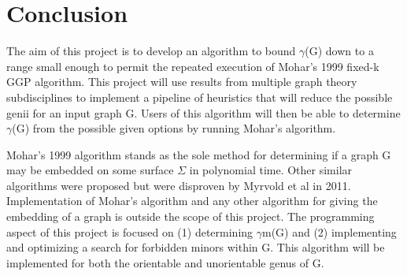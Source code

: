 \documentclass[12pt,conference]{IEEEtran}
\begin{document}
\section{Conclusion}

The aim of this project is to develop an algorithm to bound $\gamma$(G) down to a range small enough to permit the repeated execution of Mohar's 1999 fixed-k GGP algorithm. This project will use results from multiple graph theory subdisciplines to implement a pipeline of heuristics that will reduce the possible genii for an input graph G. Users of this algorithm will then be able to determine $\gamma$(G) from the possible given options by running Mohar's algorithm.

Mohar's 1999 algorithm stands as the sole method for determining if a graph G may be embedded on some surface $\Sigma$ in polynomial time. Other similar algorithms were proposed but were disproven by Myrvold et al in 2011. Implementation of Mohar's algorithm and any other algorithm for giving the embedding of a graph is outside the scope of this project. The programming aspect of this project is focused on (1) determining $\gamma$m(G) and (2) implementing and optimizing a search for forbidden minors within G. This algorithm will be implemented for both the orientable and unorientable genus of G.
\end{document}
